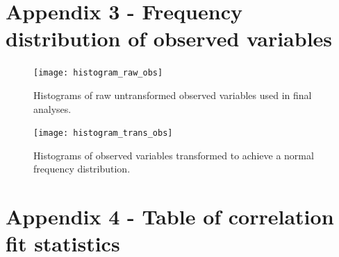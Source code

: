 \documentclass[11pt,a4paper]{article}
\begin{document}
\section*{Appendix 3 - Frequency distribution of observed variables} \label{appendixc}

\begin{figure}[H]
\centering
	\texttt{[image: histogram\_raw\_obs]}
	\caption{Histograms of raw untransformed observed variables used in final analyses.}
	\label{histogram_raw_obs}
\end{figure}

\begin{figure}[H]
\centering
	\texttt{[image: histogram\_trans\_obs]}
	\caption{Histograms of observed variables transformed to achieve a normal frequency distribution.}
	\label{histogram_trans_obs}
\end{figure}

\section*{Appendix 4 - Table of correlation fit statistics} \label{appendixd}


\end{document}

